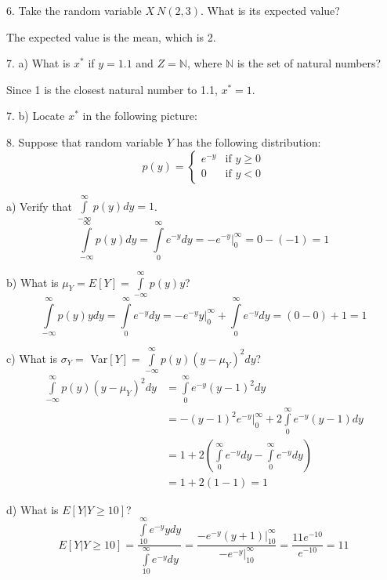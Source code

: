 \documentclass[12pt]{article}
\begin{document}
\begin{description}
\begin{doublespace}
\item[6.] Take the random variable $X ~ N(2,3)$. What is its expected value?

	The expected value is the mean, which is 2.

\newpage


\item[7. a)] What is $x^*$ if $y = 1.1$ and $Z = \mathbb{N}$, where $\mathbb{N}$ is the set of natural numbers?

	Since 1 is the closest natural number to 1.1, $x^* = 1$.


\item[7. b)] Locate $x^*$ in the following picture:
\newpage


\item[8.] Suppose that random variable $Y$ has the following distribution:
\[
	p(y) =
	\left\{
		\begin{array}{ll}
			e^{-y}  & \mbox{if } y \geq 0 \\
			0 & \mbox{if } y < 0
		\end{array}
	\right.
\]

\item[a)] Verify that  $\int \limits_{-\infty} ^{\infty} p(y)dy = 1$.
\[
	\int \limits_{-\infty} ^{\infty} p(y)dy = \int \limits_0 ^{\infty} e^{-y}dy = -e^{-y} |_0^\infty = 0 - (-1) = 1
\]

\item[b)] What is $\mu_Y = E[Y] =  \int \limits_{-\infty} ^{\infty} p(y)y$?
\[
	\int \limits_{-\infty} ^{\infty} p(y)ydy = \int \limits_0 ^{\infty} e^{-y}dy = -e^{-y}y|_0^\infty + \int \limits_0 ^{\infty} e^{-y}dy = (0 - 0) + 1 = 1
\]

\item[c)] What is $\sigma_Y =$ Var$[Y] =  \int \limits_{-\infty} ^{\infty} p(y)(y - \mu_Y)^2dy$?
\begin{align*}
	\int \limits_{-\infty} ^{\infty} p(y)(y - \mu_Y)^2dy &= \int \limits_0 ^{\infty} e^{-y}(y - 1)^2dy \\
		&= -(y-1)^2e^{-y} |_0^\infty + 2 \int \limits_0 ^{\infty} e^{-y}(y - 1)dy \\
		&= 1 + 2 ( \int \limits_0 ^{\infty} e^{-y}dy - \int \limits_0 ^{\infty} e^{-y}dy) \\
		&= 1 + 2(1-1) = 1
\end{align*}

\item[d)] What is $E[Y| Y \geq 10]$?
\[
	E[Y|Y\geq10] = \frac {\int \limits_{10} ^{\infty} e^{-y}ydy} {\int \limits_{10} ^{\infty} e^{-y}dy} = \frac {-e^{-y}(y+1) |_{10}^\infty} {-e^{-y} |_{10}^\infty} = \frac{11 e^{-10}} {e^{-10}} = 11
\]



\end{doublespace}
\end{description}
\end{document}
